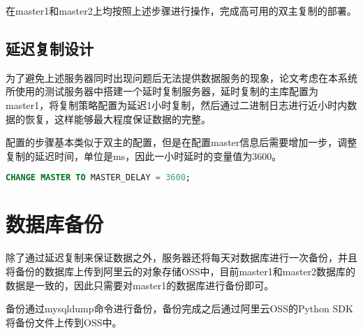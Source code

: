 在master1和master2上均按照上述步骤进行操作，完成高可用的双主复制的部署。
\subsection{延迟复制设计}
为了避免上述服务器同时出现问题后无法提供数据服务的现象，论文考虑在本系统所使用的测试服务器中搭建一个延时复制服务器，延时复制的主库配置为master1，将复制策略配置为延迟1小时复制，然后通过二进制日志进行近小时内数据的恢复，这样能够最大程度保证数据的完整。

配置的步骤基本类似于双主的配置，但是在配置master信息后需要增加一步，调整复制的延迟时间，单位是ms，因此一小时延时的变量值为3600。

\begin{lstlisting}[language=sql,numbers=none]
CHANGE MASTER TO MASTER_DELAY = 3600;
\end{lstlisting}

\section{数据库备份}
除了通过延迟复制来保证数据之外，服务器还将每天对数据库进行一次备份，并且将备份的数据库上传到阿里云的对象存储OSS中，目前master1和master2数据库的数据是一致的，因此只需要对master1的数据库进行备份即可。

备份通过mysqldump命令进行备份，备份完成之后通过阿里云OSS的Python SDK将备份文件上传到OSS中。

